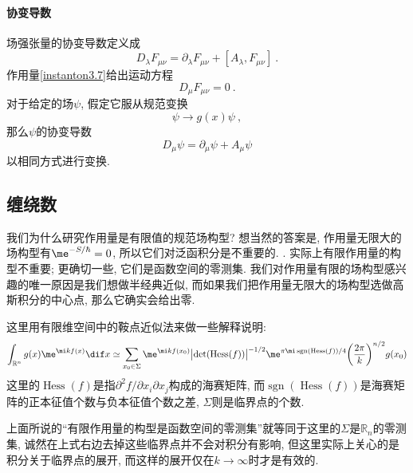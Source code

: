 \paragraph*{协变导数} 场强张量的协变导数定义成
\begin{equation}
    D_{\lambda}F_{\mu\nu} = \partial_{\lambda}F_{\mu\nu} + [A_{\lambda}, F_{\mu\nu}] \:. \label{instanton3.13}
\end{equation}
作用量\eqref{instanton3.7}给出运动方程
\begin{equation}
    D_{\mu} F_{\mu\nu} =0 \:. \label{instanton3.14}
\end{equation}
对于给定的场$\psi$, 假定它服从规范变换
\begin{equation}
    \psi \to g(x) \psi \:, \label{instanton3.15}
\end{equation}
那么$\psi$的协变导数
\begin{equation}
    D_{\mu}\psi = \partial_{\mu} \psi +A_{\mu} \psi
\end{equation}
以相同方式进行变换.

\subsection{缠绕数}

我们为什么研究作用量是有限值的规范场构型? 想当然的答案是, 作用量无限大的场构型有$\me^{-S/\hbar}=0$, 所以它们对泛函积分是不重要的. {}. 实际上有限作用量的构型不重要; 更确切一些, 它们是函数空间的零测集. 我们对作用量有限的场构型感兴趣的唯一原因是我们想做半经典近似, 而如果我们把作用量无限大的场构型选做高斯积分的中心点, 那么它确实会给出零.
\begin{tcolorbox}
  \begin{remark}
    这里用有限维空间中的鞍点近似法来做一些解释说明:
    \begin{equation*}
        \int_{\mathbb{R}^{n}} g(x)\me^{\mi k f(x)} \dif x \simeq \sum_{x_{0}\in \Sigma} \me^{\mi k f(x_{0})}
        \bigl| \det (\operatorname{Hess}(f))\bigr|^{-1/2} \me^{\pi\mi \operatorname{sgn}(\operatorname{Hess}(f))/4}
        \biggl(\frac{2\pi}{k}\biggr)^{n/2}g(x_{0})
    \end{equation*}
这里的$\operatorname{Hess}(f)$是指$\partial^{2} f/\partial x_{i}\partial x_{j}$构成的海赛矩阵, 而$\operatorname{sgn}(\operatorname{Hess}(f))$是海赛矩阵的正本征值个数与负本征值个数之差, $\Sigma$则是临界点的个数.

上面所说的``有限作用量的构型是函数空间的零测集''就等同于这里的$\Sigma$是$\mathbb{R}_{n}$的零测集, 诚然在上式右边去掉这些临界点并不会对积分有影响, 但这里实际上关心的是积分关于临界点的展开, 而这样的展开仅在$k\to \infty$时才是有效的.
  \end{remark}  
\end{tcolorbox}

